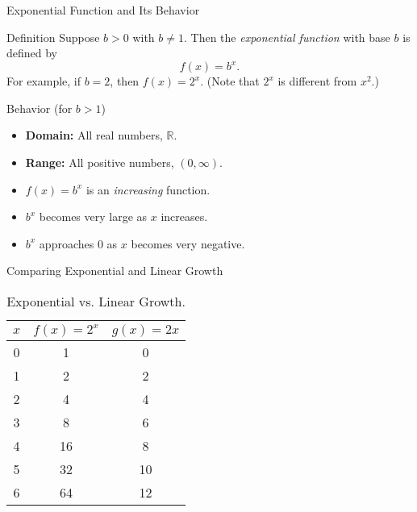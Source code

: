 \begin{frame}{Exponential Function and Its Behavior}
  \begin{block}{Definition}
    Suppose \(b>0\) with \(b\neq 1\). Then the \emph{exponential function} with base \(b\) is defined by
    \[
      f(x)=b^x.
    \]
    For example, if \(b=2\), then \(f(x)=2^x\). (Note that \(2^x\) is different from \(x^2\).)
  \end{block}
  \vspace{0.5em}
  \begin{block}{Behavior (for \(b>1\))}
    \begin{itemize}
      \item \textbf{Domain:} All real numbers, \(\mathbb{R}\).
      \item \textbf{Range:} All positive numbers, \((0,\infty)\).
      \item \(f(x)=b^x\) is an \emph{increasing} function.
      \item \(b^x\) becomes very large as \(x\) increases.
      \item \(b^x\) approaches \(0\) as \(x\) becomes very negative.
    \end{itemize}
  \end{block}
\end{frame}

\begin{frame}{Comparing Exponential and Linear Growth}
  \begin{table}[ht]
    \centering
    \begin{tabular}{c|c|c}
      \(x\) & \(f(x)=2^x\) & \(g(x)=2x\) \\ \hline
      0 & 1 & 0 \\
      1 & 2 & 2 \\
      2 & 4 & 4 \\
      3 & 8 & 6 \\
      4 & 16 & 8 \\
      5 & 32 & 10 \\
      6 & 64 & 12 \\
    \end{tabular}
    \caption{Exponential vs. Linear Growth.}
  \end{table}
\end{frame}


